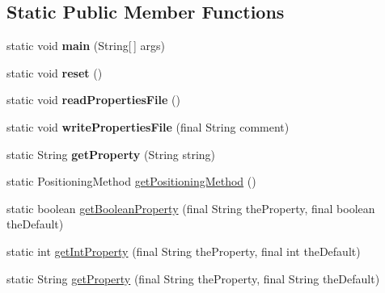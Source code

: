 \subsection*{Static Public Member Functions}
\begin{DoxyCompactItemize}
\item 
\hypertarget{classgov_1_1fnal_1_1ppd_1_1dd_1_1util_1_1nonguiUtils_1_1PropertiesFile_a2a63d201aea361aeaa8c6a661212d38f}{static void {\bfseries main} (String\mbox{[}$\,$\mbox{]} args)}\label{classgov_1_1fnal_1_1ppd_1_1dd_1_1util_1_1nonguiUtils_1_1PropertiesFile_a2a63d201aea361aeaa8c6a661212d38f}

\item 
\hypertarget{classgov_1_1fnal_1_1ppd_1_1dd_1_1util_1_1nonguiUtils_1_1PropertiesFile_aa4808ef580cbf59dbb145b2eca31fd08}{static void {\bfseries reset} ()}\label{classgov_1_1fnal_1_1ppd_1_1dd_1_1util_1_1nonguiUtils_1_1PropertiesFile_aa4808ef580cbf59dbb145b2eca31fd08}

\item 
\hypertarget{classgov_1_1fnal_1_1ppd_1_1dd_1_1util_1_1nonguiUtils_1_1PropertiesFile_a41f058e2cc7f432f293795decbd910a1}{static void {\bfseries read\-Properties\-File} ()}\label{classgov_1_1fnal_1_1ppd_1_1dd_1_1util_1_1nonguiUtils_1_1PropertiesFile_a41f058e2cc7f432f293795decbd910a1}

\item 
\hypertarget{classgov_1_1fnal_1_1ppd_1_1dd_1_1util_1_1nonguiUtils_1_1PropertiesFile_ac7322098b9553f60448f3286a44c68e1}{static void {\bfseries write\-Properties\-File} (final String comment)}\label{classgov_1_1fnal_1_1ppd_1_1dd_1_1util_1_1nonguiUtils_1_1PropertiesFile_ac7322098b9553f60448f3286a44c68e1}

\item 
\hypertarget{classgov_1_1fnal_1_1ppd_1_1dd_1_1util_1_1nonguiUtils_1_1PropertiesFile_ad3e5ac77723df18cb845643e3e219f49}{static String {\bfseries get\-Property} (String string)}\label{classgov_1_1fnal_1_1ppd_1_1dd_1_1util_1_1nonguiUtils_1_1PropertiesFile_ad3e5ac77723df18cb845643e3e219f49}

\item 
static Positioning\-Method \hyperlink{classgov_1_1fnal_1_1ppd_1_1dd_1_1util_1_1nonguiUtils_1_1PropertiesFile_ac40ab7846140bf28b00bb3a3427bb675}{get\-Positioning\-Method} ()
\item 
static boolean \hyperlink{classgov_1_1fnal_1_1ppd_1_1dd_1_1util_1_1nonguiUtils_1_1PropertiesFile_a90e03a48aea04fa11243c8aecac470e3}{get\-Boolean\-Property} (final String the\-Property, final boolean the\-Default)
\item 
static int \hyperlink{classgov_1_1fnal_1_1ppd_1_1dd_1_1util_1_1nonguiUtils_1_1PropertiesFile_a5ed1fc6f67450475cdff0256ca4d6aad}{get\-Int\-Property} (final String the\-Property, final int the\-Default)
\item 
static String \hyperlink{classgov_1_1fnal_1_1ppd_1_1dd_1_1util_1_1nonguiUtils_1_1PropertiesFile_a1a69f3f3cadbe2d83c6aa753809b6717}{get\-Property} (final String the\-Property, final String the\-Default)
\end{DoxyCompactItemize}


